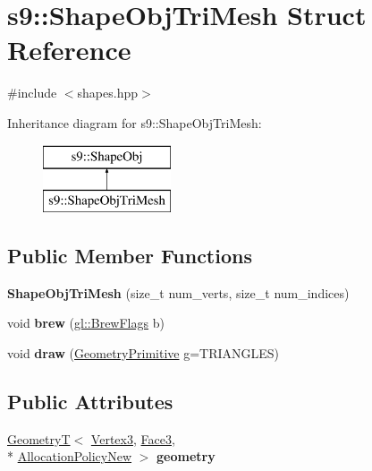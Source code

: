 \hypertarget{structs9_1_1ShapeObjTriMesh}{\section{s9\-:\-:Shape\-Obj\-Tri\-Mesh Struct Reference}
\label{structs9_1_1ShapeObjTriMesh}
}


{\ttfamily \#include $<$shapes.\-hpp$>$}

Inheritance diagram for s9\-:\-:Shape\-Obj\-Tri\-Mesh\-:\begin{figure}[H]
\begin{center}
\leavevmode
\includegraphics[height=2.000000cm]{structs9_1_1ShapeObjTriMesh}
\end{center}
\end{figure}
\subsection*{Public Member Functions}
\begin{DoxyCompactItemize}
\item 
\hypertarget{structs9_1_1ShapeObjTriMesh_af3cd62b9f5517a5666a770fe1a687258}{{\bfseries Shape\-Obj\-Tri\-Mesh} (size\-\_\-t num\-\_\-verts, size\-\_\-t num\-\_\-indices)}\label{structs9_1_1ShapeObjTriMesh_af3cd62b9f5517a5666a770fe1a687258}

\item 
\hypertarget{structs9_1_1ShapeObjTriMesh_a3c053d492be87696152dae2ee4565a38}{void {\bfseries brew} (\hyperlink{structs9_1_1gl_1_1BrewFlags}{gl\-::\-Brew\-Flags} b)}\label{structs9_1_1ShapeObjTriMesh_a3c053d492be87696152dae2ee4565a38}

\item 
\hypertarget{structs9_1_1ShapeObjTriMesh_a37faa2eccab6e1982cb1e37b2616159b}{void {\bfseries draw} (\hyperlink{namespaces9_ad57d1332f8fd67d23f6a1d3520ab785c}{Geometry\-Primitive} g=T\-R\-I\-A\-N\-G\-L\-E\-S)}\label{structs9_1_1ShapeObjTriMesh_a37faa2eccab6e1982cb1e37b2616159b}

\end{DoxyCompactItemize}
\subsection*{Public Attributes}
\begin{DoxyCompactItemize}
\item 
\hypertarget{structs9_1_1ShapeObjTriMesh_a65d4797d565ed8e64fdf0798c84a21aa}{\hyperlink{classs9_1_1GeometryT}{Geometry\-T}$<$ \hyperlink{structs9_1_1VertexT}{Vertex3}, \hyperlink{structs9_1_1FaceT}{Face3}, \\*
\hyperlink{classs9_1_1AllocationPolicyNew}{Allocation\-Policy\-New} $>$ {\bfseries geometry}}\label{structs9_1_1ShapeObjTriMesh_a65d4797d565ed8e64fdf0798c84a21aa}

\end{DoxyCompactItemize}


